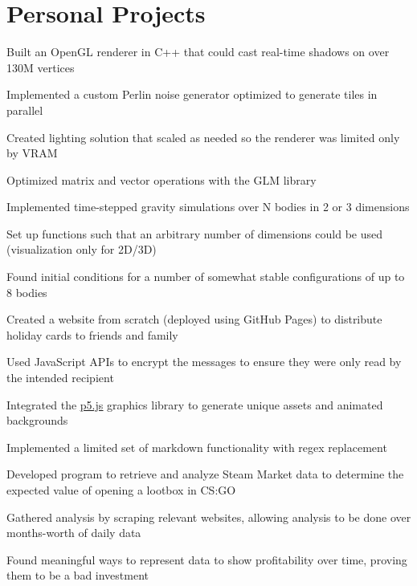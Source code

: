 \section{Personal Projects}

\begin{bullets}
    \item Built an OpenGL renderer in C++ that could cast real-time shadows on over 130M vertices
    \item Implemented a custom Perlin noise generator optimized to generate tiles in parallel
    \item Created lighting solution that scaled as needed so the renderer was limited only by VRAM
    \item Optimized matrix and vector operations with the GLM library
\end{bullets}

\begin{bullets}
    \item Implemented time-stepped gravity simulations over N bodies in 2 or 3 dimensions
    \item Set up functions such that an arbitrary number of dimensions could be used (visualization only for 2D/3D)
    \item Found initial conditions for a number of somewhat stable configurations of up to 8 bodies
\end{bullets}

\begin{bullets}
    \item Created a website from scratch (deployed using GitHub Pages) to distribute holiday cards to friends and family
    \item Used JavaScript APIs to encrypt the messages to ensure they were only read by the intended recipient
    \item Integrated the \href{https://p5js.org}{\underline{p5.js}} graphics library to generate unique assets and animated backgrounds
    \item Implemented a limited set of markdown functionality with regex replacement
\end{bullets}

\begin{bullets}
    \item Developed program to retrieve and analyze Steam Market data to determine the expected value of opening a lootbox in CS:GO
    \item Gathered analysis by scraping relevant websites, allowing analysis to be done over months-worth of daily data
    \item Found meaningful ways to represent data to show profitability over time, proving them to be a bad investment
\end{bullets}
